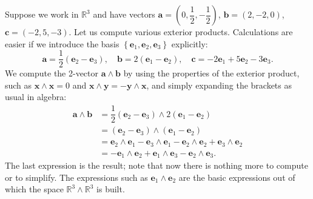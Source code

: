 Suppose we work in $\mathbb{R}^{3}$ and have vectors $\mathbf{a}=\left(0,\dfrac{1}{2},-\dfrac{1}{2}\right)$,
$\mathbf{b}=\left(2,-2,0\right)$, $\mathbf{c}=\left(-2,5,-3\right)$.
Let us compute various exterior products. Calculations are easier
if we introduce the basis $\left\{ \mathbf{e}_{1},\mathbf{e}_{2},\mathbf{e}_{3}\right\} $
explicitly:\[
\mathbf{a}=\dfrac{1}{2}\left(\mathbf{e}_{2}-\mathbf{e}_{3}\right),\quad\mathbf{b}=2(\mathbf{e}_{1}-\mathbf{e}_{2}),\quad\mathbf{c}=-2\mathbf{e}_{1}+5\mathbf{e}_{2}-3\mathbf{e}_{3}.\]
We compute the 2-vector $\mathbf{a}\wedge\mathbf{b}$ by using the
properties of the exterior product, such as $\mathbf{x}\wedge\mathbf{x}=0$
and $\mathbf{x}\wedge\mathbf{y}=-\mathbf{y}\wedge\mathbf{x}$, and
simply expanding the brackets as usual in algebra:\begin{align*}
\mathbf{a}\wedge\mathbf{b} & =\dfrac{1}{2}\left(\mathbf{e}_{2}-\mathbf{e}_{3}\right)\wedge2\left(\mathbf{e}_{1}-\mathbf{e}_{2}\right)\\
 & =\left(\mathbf{e}_{2}-\mathbf{e}_{3}\right)\wedge\left(\mathbf{e}_{1}-\mathbf{e}_{2}\right)\\
 & =\mathbf{e}_{2}\wedge\mathbf{e}_{1}-\mathbf{e}_{3}\wedge\mathbf{e}_{1}-\mathbf{e}_{2}\wedge\mathbf{e}_{2}+\mathbf{e}_{3}\wedge\mathbf{e}_{2}\\
 & =-\mathbf{e}_{1}\wedge\mathbf{e}_{2}+\mathbf{e}_{1}\wedge\mathbf{e}_{3}-\mathbf{e}_{2}\wedge\mathbf{e}_{3}.\end{align*}
The last expression is the result; note that now there is nothing
more to compute or to simplify. The expressions such as $\mathbf{e}_{1}\wedge\mathbf{e}_{2}$
are the basic expressions out of which the space $\mathbb{R}^{3}\wedge\mathbb{R}^{3}$
is built. 

